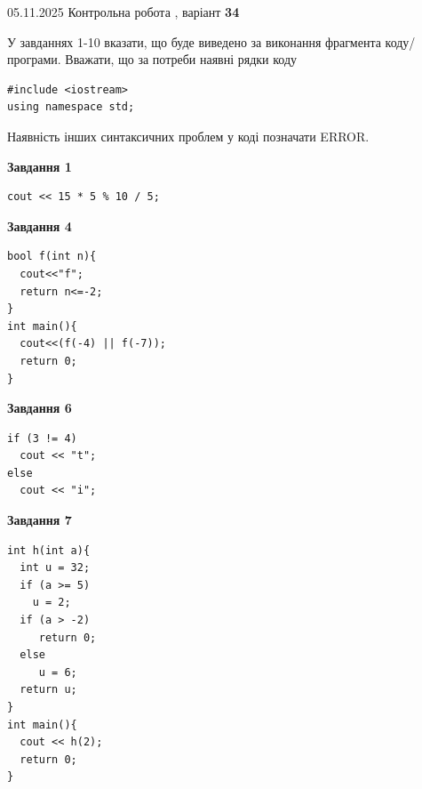 \documentclass[12pt, ukrainian]{article}
\begin{document}
{\Large{05.11.2025 Контрольна робота , варіант  \No \textbf { 34 }\par}}
{
\begin {large}
У завданнях 1-10 вказати, що буде виведено за виконання фрагмента коду/про\-гра\-ми.
Вважати, що за потреби наявні рядки коду
\begin{verbatim}
#include <iostream>
using namespace std;
\end{verbatim}
Наявність інших синтаксичних проблем у коді позначати ERROR.

\begin{minipage}[t]{7.0cm}

\begin{center}
\textbf{Завдання 1}
\end{center}
\vspace{-8mm}

\begin{verbatim}
cout << 15 * 5 % 10 / 5;
\end{verbatim}



\begin{center}
\textbf{Завдання 4}
\end{center}
\vspace{-8mm}

\begin{verbatim}
bool f(int n){
  cout<<"f";
  return n<=-2;
}
int main(){
  cout<<(f(-4) || f(-7));
  return 0;
}
\end{verbatim}



\begin{center}
\textbf{Завдання 6}
\end{center}
\vspace{-8mm}

\begin{verbatim}
if (3 != 4)
  cout << "t";
else
  cout << "i";
\end{verbatim}



\begin{center}
\textbf{Завдання 7}
\end{center}
\vspace{-8mm}

\begin{verbatim}
int h(int a){
  int u = 32;
  if (a >= 5)
    u = 2;
  if (a > -2)
     return 0;
  else
     u = 6;
  return u;
}
int main(){
  cout << h(2);
  return 0;
}
\end{verbatim}


\end{minipage}
\end{large}}
\end{document}
